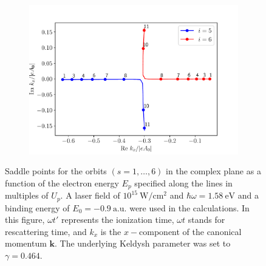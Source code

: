 \begin{figure}
\begin{subfigure}[b]{0.33\linewidth}
\end{subfigure}
\begin{subfigure}[b]{0.33\linewidth}
  \includegraphics[width=\textwidth]{figures/ch_ATI_SPA/rescattering/momentum56.pdf}
\end{subfigure}
\caption{Saddle points for the orbits $(s = 1,\dots,6)$ in the complex
  plane as a function of the electron energy $E_{p}$ specified along
  the lines in multiples of $U_{p}$. A laser field of
  $10^{15}\ \mathrm{W/cm^{2}}$ and $\hbar\omega = 1.58\ \mathrm{eV}$
  and a binding energy of $E_{0} = -0.9\ \mathrm{a.u.}$ were used in
  the calculations. In this figure, $\omega t'$ represents the
  ionization time, $\omega t$ stands for rescattering time, and
  $k_{x}$ is the $x-$component of the canonical momentum
  $\mathbf{k}$. The underlying Keldysh parameter was set to $\gamma =
  0.464$.}
  \label{fig:complex_paths}
\end{figure}

